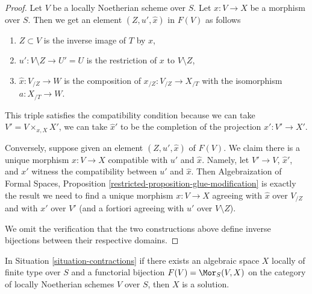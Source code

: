 \begin{proof}
Let $V$ be a locally Noetherian scheme over $S$.
Let $x : V \to X$ be a morphism over $S$.
Then we get an element $(Z, u', \hat x)$ in $F(V)$ as follows
\begin{enumerate}
\item $Z \subset V$ is the inverse image of $T$ by $x$,
\item $u' : V \setminus Z \to U' = U$ is the restriction of
$x$ to $V \setminus Z$,
\item $\hat x : V_{/Z} \to W$ is the composition of
$x_{/Z} : V_{/Z} \to X_{/T}$ with the isomorphism $a : X_{/T} \to W$.
\end{enumerate}
This triple satisfies the compatibility condition because we
can take $V' = V \times_{x, X} X'$, we can take $\hat x'$ to be
the completion of the projection $x' : V' \to X'$.

\medskip\noindent
Conversely, suppose given an element $(Z, u', \hat x)$ of $F(V)$. We claim
there is a unique morphism $x : V \to X$ compatible with $u'$ and $\hat x$.
Namely, let $V' \to V$, $\hat x'$, and $x'$ witness the
compatibility between $u'$ and $\hat x$. Then
Algebraization of Formal Spaces, Proposition
\ref{restricted-proposition-glue-modification}
is exactly the result we need to find
a unique morphism $x : V \to X$ agreeing with
$\hat x$ over $V_{/Z}$ and with $x'$ over $V'$ (and a fortiori
agreeing with $u'$ over $V \setminus Z$).

\medskip\noindent
We omit the verification that the two constructions above define inverse
bijections between their respective domains.
\end{proof}

\begin{lemma}
\label{lemma-functor-is-solution}
In Situation \ref{situation-contractions} if there exists an
algebraic space $X$ locally of finite type over $S$ and a
functorial bijection $F(V) = \Mor_S(V, X)$ on the category of
locally Noetherian schemes $V$ over $S$, then $X$ is a solution.
\end{lemma}

